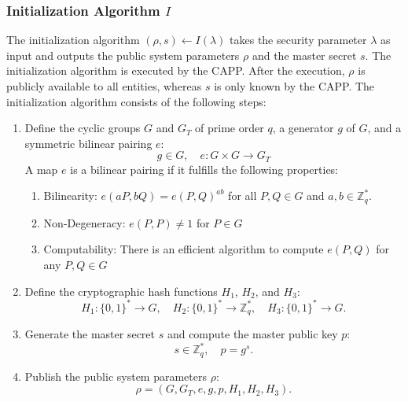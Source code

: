 \subsubsection{Initialization Algorithm $I$}
The initialization algorithm $(\rho, s) \leftarrow I(\lambda)$ takes the security parameter $\lambda$ as input and outputs the public system parameters $\rho$ and the master secret $s$.
The initialization algorithm is executed by the CAPP.
After the execution, $\rho$ is publicly available to all entities, whereas $s$ is only known by the CAPP.
The initialization algorithm consists of the following steps:
\begin{enumerate}
    \item Define the cyclic groups $G$ and $G_T$ of prime order $q$, a generator $g$ of $G$, and a symmetric bilinear pairing $e$:
    \[
        g \in G,
        \quad e: G \times G \rightarrow G_T
    \]
    A map $e$ is a bilinear pairing if it fulfills the following properties:
    \begin{enumerate}
        \item Bilinearity: $e(aP, bQ) = e(P, Q)^{ab}$ for all $P, Q \in G$ and $a, b \in \mathbb{Z}_q^*$.
        \item Non-Degeneracy: $e(P, P) \neq 1$ for $P \in G$
        \item Computability: There is an efficient algorithm to compute $e(P, Q)$ for any $P, Q \in G$
    \end{enumerate}
    \item Define the cryptographic hash functions $H_1$, $H_2$, and $H_3$:
    \[
        H_1: \{0,1\}^* \to G,
        \quad H_2: \{0,1\}^* \to \mathbb{Z}_q^*,
        \quad H_3: \{0,1\}^* \to G.
    \]
    \item Generate the master secret $s$ and compute the master public key $p$:
    \[
        s \in \mathbb{Z}_q^*,
        \quad p = g^{s}.
    \]
    \item Publish the public system parameters $\rho$:
    \[
        \rho = (G, G_T, e, g, p, H_{1}, H_{2}, H_{3}).
    \]
\end{enumerate}

